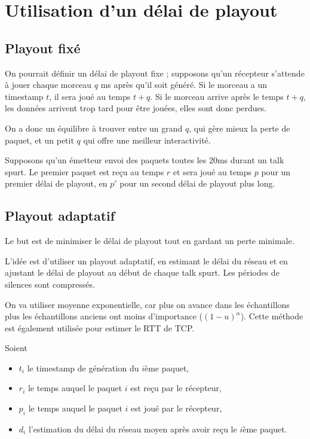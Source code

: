 		\section{Utilisation d'un délai de playout}
		
		
			\subsection{Playout fixé}
			On pourrait définir un délai de playout fixe ; supposons qu'un récepteur s'attende à jouer chaque morceau $q$ ms après qu'il soit généré. Si le morceau a un timestamp $t$, il sera joué au temps $t + q$. Si le morceau arrive après le temps $t + q$, les données arrivent trop tard pour être jouées, elles sont donc perdues.
		
			On a donc un équilibre à trouver entre un grand $q$, qui gère mieux la perte de paquet, et un petit $q$ qui offre une meilleur interactivité.
		
			Supposons qu'un émetteur envoi des paquets toutes les 20ms durant un talk spurt. Le premier paquet est reçu au temps $r$ et sera joué au temps $p$ pour un premier délai de playout, en $p'$ pour un second délai de playout plus long.
		
		
	
			\subsection{Playout adaptatif}
			
			Le but est de minimiser le délai de playout tout en gardant un perte minimale.
			
			L'idée est d'utiliser un playout adaptatif, en estimant le délai du réseau et en ajustant le délai de playout au début de chaque talk spurt. Les périodes de silences sont compressés.
			
			On va utiliser moyenne exponentielle, car plus on avance dans les échantillons plus les échantillons anciens ont moins d'importance ($(1 - u)^\alpha$). Cette méthode est également utilisée pour estimer le RTT de TCP.
			
			Soient
			
			\begin{itemize}
				\item $t_i$ le timestamp de génération du $i$ème paquet,
				\item $r_i$ le temps auquel le paquet $i$ est reçu par le récepteur,
				\item $p_i$ le temps auquel le paquet $i$ est joué par le récepteur,
				\item $d_i$ l'estimation du délai du réseau moyen après avoir reçu le $i$ème paquet.
			\end{itemize}
			
